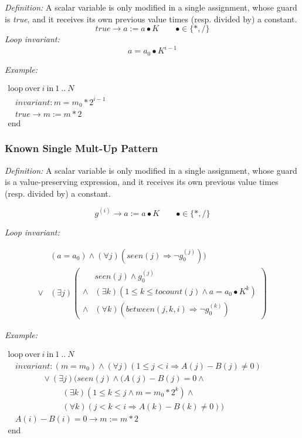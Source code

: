 \documentclass[a4paper,10pt]{article}
\newcommand{\idx}{\ensuremath{i}\xspace}
\newcommand{\at}[1]{{(#1)}}
\newcommand{\KWloop}{\ensuremath{\mathrm{loop}~}}
\newcommand{\KWend}{\ensuremath{\mathrm{end}~}}
\newcommand{\KWover}{\ensuremath{\mathrm{over}~}}
\newcommand{\KWin}{\ensuremath{~\mathrm{in}~}}
\newcommand{\impl}{\ensuremath{\Longrightarrow}}
\newcommand{\seen}[1]{\ensuremath{\mathit{seen}(#1)}\xspace}
\newcommand{\tocount}[1]{\ensuremath{\mathit{tocount}(#1)}\xspace}
\newcommand{\between}[3]{\ensuremath{\mathit{between}{(#1,#2,#3)}}\xspace}
\newcommand{\loopinvariant}{\noindent\textit{Loop invariant:}\xspace}
\newcommand{\patterndef}{\noindent\textit{Definition:}\xspace}
\newcommand{\patternexample}{\noindent\textit{Example:}\xspace}
\begin{document}
\patterndef A scalar variable is only modified in a single assignment, whose
guard is \textit{true}, and it receives its own previous value times
(resp. divided by) a constant.
%
$$\mathit{true} \rightarrow a := a \bullet K \qquad \bullet \in \{*, / \}$$
%
\loopinvariant
%
$$a = a_0 \bullet K^{i-1}$$

\bigskip
\patternexample

\medskip
$\begin{array}{l}
  \KWloop \KWover i \KWin 1~..~N \\
  ~~~~ \textit{invariant}: m = m_0 * 2^{i-1}\\
  ~~~~ true \rightarrow m := m*2\\
  \KWend
\end{array}$

\subsubsection*{Known Single Mult-Up Pattern}

\patterndef A scalar variable is only modified in a single assignment, whose
guard is a value-preserving expression, and it receives its own previous value times
(resp. divided by) a constant.

$$g^\at{\idx} \rightarrow a := a \bullet K  \qquad \bullet \in \{*, / \}$$

\loopinvariant

\begin{eqnarray*}
&(a = a_0) \land (\forall j)(\seen{j} \impl \neg g_0^\at{j})) \\
\lor 
& (\exists j)
\left(\begin{array}{cl}
& \seen{j} \land g_0^\at{j} \\
\land& (\exists k)(1 \leq k \leq \tocount{j} \land a = a_0 \bullet K^k)\\
\land& (\forall k)(\between{j}{k}{\idx} \impl \neg g_0^\at{k})
\end{array}\right)
\end{eqnarray*}

\bigskip
\patternexample

\medskip
$\begin{array}{l}
  \KWloop \KWover i \KWin 1~..~N \\
  ~~~~ \textit{invariant}: (m = m_0) \land (\forall j)(1 \leq j < i \impl A(j)-B(j)\neq0)\\
  ~~~~~~~~~~~~~~~~~~~ \lor (\exists j)(\seen{j} \land (A(j)-B(j)= 0 \land \\
  ~~~~~~~~~~~~~~~~~~~~~~~~~~~~~~ (\exists k)(1 \leq k \leq j \land m = m_0 * 2^k) \land\\
  ~~~~~~~~~~~~~~~~~~~~~~~~~~~~~~ (\forall k)(j < k < i \impl A(k)-B(k)\neq0))\\
  ~~~~ A(i)-B(i)=0 \rightarrow m := m*2\\
  \KWend
\end{array}$
\end{document}
